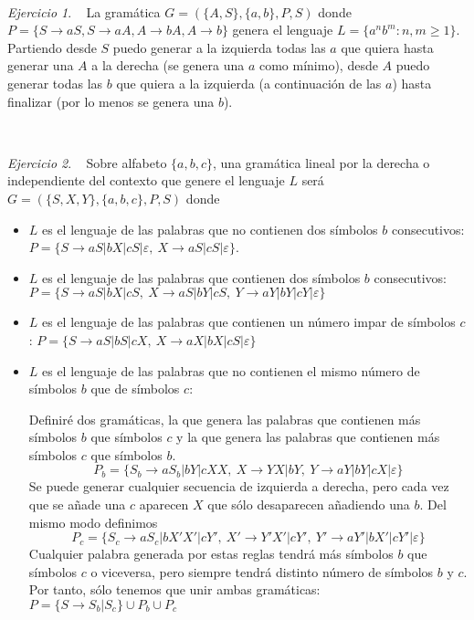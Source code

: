 \documentclass[12pt,spanish]{article}
\theoremstyle{definition}
\theoremstyle{remark}
\newtheorem{exercise}{Ejercicio}%
\begin{document}
~
\begin{exercise}~ La gramática $G=(\{A,S\},\{a,b\},P,S)$ donde \\
  $P=\{S\rightarrow aS, S \rightarrow aA, A \rightarrow bA, A
  \rightarrow b\}$ genera el lenguaje $L=\{a^nb^m: n,m \geq 1\}$.
  Partiendo desde $S$ puedo generar a la izquierda todas las $a$ que
  quiera hasta generar una $A$ a la derecha (se genera una $a$ como
  mínimo), desde $A$ puedo generar todas las $b$ que quiera a la
  izquierda (a continuación de las $a$) hasta finalizar (por lo menos
  se genera una $b$).
\end{exercise}
~
\begin{exercise}~ Sobre alfabeto $\{a,b,c\}$, una gramática lineal por
  la derecha o independiente del contexto que genere el lenguaje $L$
  será $G=(\{S,X,Y\},\{a,b,c\},P,S)$ donde
  \begin{itemize}
  \item $L$ es el lenguaje de las palabras que no contienen dos
    símbolos $b$ consecutivos:
    $P=\{S\rightarrow aS|bX|cS|\varepsilon, \ X\rightarrow
    aS|cS|\varepsilon\}$.
  \item $L$ es el lenguaje de las palabras que contienen dos símbolos
    $b$ consecutivos: \\
    $P=\{S\rightarrow aS|bX|cS, \ X\rightarrow aS|bY|cS, \ Y
    \rightarrow aY|bY|cY|\varepsilon\}$
  \item $L$ es el lenguaje de las palabras que contienen un número
    impar de símbolos $c$:
    $P=\{S\rightarrow aS|bS|cX, \ X\rightarrow aX|bX|cS|\varepsilon\}$
  \item $L$ es el lenguaje de las palabras que no contienen el mismo
    número de símbolos $b$ que de símbolos $c$:

    Definiré dos gramáticas, la que genera las palabras que contienen
    más símbolos $b$ que símbolos $c$ y la que genera las palabras que
    contienen más símbolos $c$ que símbolos $b$.
    \[P_b=\{S_b\rightarrow aS_b|bY|cXX, \ X \rightarrow YX|bY, \ Y
      \rightarrow aY|bY|cX|\varepsilon\}\] Se puede generar cualquier
    secuencia de izquierda a derecha, pero cada vez que se añade una
    $c$ aparecen $X$ que sólo desaparecen añadiendo una $b$. Del
    mismo modo definimos
    \[P_c=\{S_c\rightarrow aS_c|bX'X'|cY', \ X' \rightarrow Y'X'|cY',
      \ Y' \rightarrow aY'|bX'|cY'|\varepsilon\}\] Cualquier palabra
    generada por estas reglas tendrá más símbolos $b$ que símbolos $c$
    o viceversa, pero siempre tendrá distinto número de símbolos $b$ y
    $c$. Por tanto, sólo tenemos que unir ambas gramáticas:
    $P=\{S\rightarrow S_b|S_c\} \cup P_b \cup P_c$
  \end{itemize}
\end{exercise}
\end{document}
